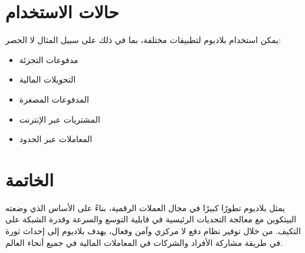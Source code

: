 \documentclass[11pt,a4paper]{article}
\begin{document}
\section{حالات الاستخدام}
يمكن استخدام بلاديوم لتطبيقات مختلفة، بما في ذلك على سبيل المثال لا الحصر:
\begin{itemize}
    \item مدفوعات التجزئة
    \item التحويلات المالية
    \item المدفوعات المصغرة
    \item المشتريات عبر الإنترنت
    \item المعاملات عبر الحدود
\end{itemize}

\section{الخاتمة}
يمثل بلاديوم تطورًا كبيرًا في مجال العملات الرقمية، بناءً على الأساس الذي وضعته البيتكوين مع معالجة التحديات الرئيسية في قابلية التوسع والسرعة وقدرة الشبكة على التكيف. من خلال توفير نظام دفع لا مركزي وآمن وفعال، يهدف بلاديوم إلى إحداث ثورة في طريقة مشاركة الأفراد والشركات في المعاملات المالية في جميع أنحاء العالم.
\end{document}
